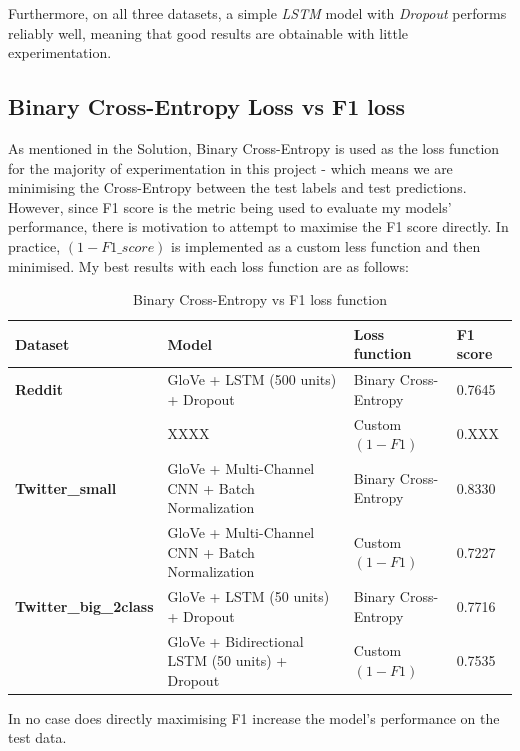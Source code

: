 \documentclass[12pt,a4paper]{article}
\begin{document}
Furthermore, on all three datasets, a simple \textit{LSTM} model with \textit{Dropout} performs reliably well, meaning that good results are obtainable with little experimentation.


\subsection{Binary Cross-Entropy Loss vs F1 loss}
As mentioned in the Solution, Binary Cross-Entropy is used as the loss function for the majority of experimentation in this project - which means we are minimising the Cross-Entropy between the test labels and test predictions. However, since F1 score is the metric being used to evaluate my models' performance, there is motivation to attempt to maximise the F1 score directly. In practice, $(1-F1\_score)$ is implemented as a custom less function and then minimised. My best results with each loss function are as follows:

\begin{table}[H]
	\centering
	\vspace*{-10pt}
	\caption{Binary Cross-Entropy vs F1 loss function}
	\label{F1Loss}
	\hspace*{-2.0cm}
	\begin{tabular}{p{3.2cm} p{9cm} p{3.9cm} p{1.7cm}} \hline\hline
		\textbf{Dataset} & \textbf{Model} & \textbf{Loss function} & \textbf{F1 score}  \\ \hline
		
		\textbf{Reddit} & GloVe + LSTM (500 units) + Dropout & Binary Cross-Entropy & 0.7645  \\
		& XXXX & Custom $(1-F1)$ & 0.XXX  \\ \hline
		
		\textbf{Twitter\_small} & GloVe + Multi-Channel CNN + Batch Normalization & Binary Cross-Entropy & 0.8330 \\
		& GloVe + Multi-Channel CNN + Batch Normalization & Custom $(1-F1)$ & 0.7227 \\ \hline
		
		\textbf{Twitter\_big\_2class} & GloVe + LSTM (50 units) + Dropout & Binary Cross-Entropy & 0.7716 \\
		& GloVe + Bidirectional LSTM (50 units) + Dropout & Custom $(1-F1)$ & 0.7535 \\ \hline
	\end{tabular}
\end{table}

In no case does directly maximising F1 increase the model's performance on the test data. 
\end{document}
